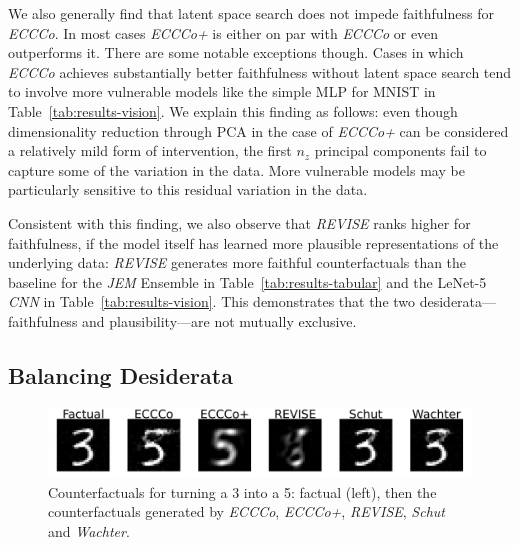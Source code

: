 \documentclass[letterpaper]{article} %
\begin{document}
We also generally find that latent space search does not impede faithfulness for \textit{ECCCo}. In most cases \textit{ECCCo+} is either on par with \textit{ECCCo} or even outperforms it. There are some notable exceptions though. Cases in which \textit{ECCCo} achieves substantially better faithfulness without latent space search tend to involve more vulnerable models like the simple MLP for MNIST in Table~\ref{tab:results-vision}. We explain this finding as follows: even though dimensionality reduction through PCA in the case of \textit{ECCCo+} can be considered a relatively mild form of intervention, the first $n_z$ principal components fail to capture some of the variation in the data. More vulnerable models may be particularly sensitive to this residual variation in the data. 

Consistent with this finding, we also observe that \textit{REVISE} ranks higher for faithfulness, if the model itself has learned more plausible representations of the underlying data: \textit{REVISE} generates more faithful counterfactuals than the baseline for the \textit{JEM} Ensemble in Table~\ref{tab:results-tabular} and the LeNet-5 \textit{CNN} in Table~\ref{tab:results-vision}. This demonstrates that the two desiderata---faithfulness and plausibility---are not mutually exclusive.

\subsection{Balancing Desiderata}

\begin{figure}
  \centering
  \includegraphics[width=1.0\linewidth]{figures/mnist_benchmark.png}
  \caption{Counterfactuals for turning a 3 into a 5: factual (left), then the counterfactuals generated by \textit{ECCCo}, \textit{ECCCo+}, \textit{REVISE}, \textit{Schut} and \textit{Wachter}.}\label{fig:mnist-bmk}
\end{figure}
\end{document}
